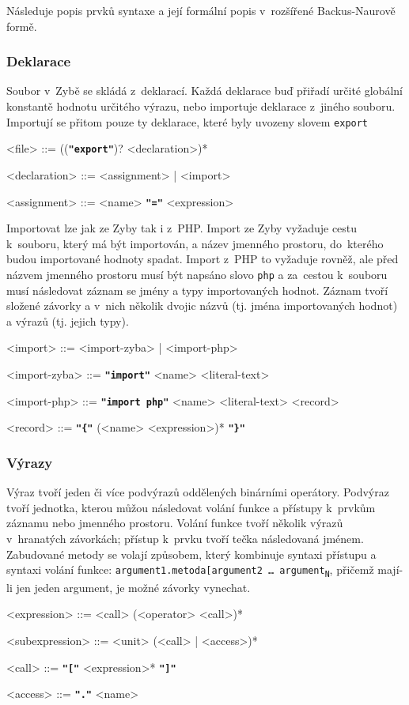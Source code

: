 \documentclass[a4paper,12pt]{article}
\def\quote #1{"#1"}
\def\emphasis #1{\textbf{\texttt{\quote{#1}}}}
\begin{document}
Následuje popis prvků syntaxe a její formální popis v~rozšířené Backus-Naurově formě.

\subsubsection{Deklarace}
Soubor v~Zybě se skládá z~deklarací. Každá deklarace buď přiřadí určité globální konstantě hodnotu určitého výrazu, nebo importuje deklarace z~jiného souboru. Importují se přitom pouze ty deklarace, které byly uvozeny slovem \texttt{export}
\begin{grammar}
<file> ::= ((\emphasis{export})? <declaration>)*

<declaration> ::= <assignment> | <import>

<assignment> ::= <name> \emphasis{=} <expression>
\end{grammar}

Importovat lze jak ze Zyby tak i z~PHP. Import ze Zyby vyžaduje cestu k~souboru, který má být importován, a název jmenného prostoru, do~kterého budou importované hodnoty spadat. Import z~PHP to vyžaduje rovněž, ale před názvem jmenného prostoru musí být napsáno slovo \texttt{php} a za~cestou k~souboru musí následovat záznam se jmény a typy importovaných hodnot. Záznam tvoří složené závorky a v~nich několik dvojic názvů (tj. jména importovaných hodnot) a výrazů (tj. jejich typy).
\begin{grammar}
<import> ::= <import-zyba> | <import-php>

<import-zyba> ::= \emphasis{import} <name> <literal-text>

<import-php> ::= \emphasis{import php} <name> <literal-text> <record>

<record> ::= \emphasis{\{} (<name> <expression>)* \emphasis{\}}
\end{grammar}

\subsubsection{Výrazy}
Výraz tvoří jeden či více podvýrazů oddělených binárními operátory. Podvýraz tvoří jednotka, kterou můžou následovat volání funkce a přístupy k~prvkům záznamu nebo jmenného prostoru. Volání funkce tvoří několik výrazů v~hranatých závorkách; přístup k~prvku tvoří tečka následovaná jménem. Zabudované metody se volají způsobem, který kombinuje syntaxi přístupu a syntaxi volání funkce: \texttt{argument1.metoda[argument2 \ldots{} argument\textsubscript{N}}, přičemž mají-li jen jeden argument, je možné závorky vynechat.
\begin{grammar}
<expression> ::= <call> (<operator> <call>)*

<subexpression> ::= <unit> (<call> | <access>)*

<call> ::= \emphasis{[} <expression>* \emphasis{]}

<access> ::= \emphasis{.} <name>
\end{grammar}
\end{document}
